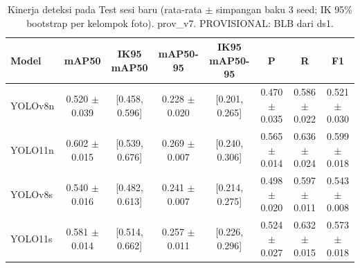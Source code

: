 \begin{table}[!t]
\centering
\caption{Kinerja deteksi pada Test sesi baru (rata-rata $\pm$ simpangan baku 3 seed; IK 95\% bootstrap per kelompok foto). prov\_v7. PROVISIONAL: BLB dari ds1.}
\label{tab:utama_test_new_session_dengan_background}
\footnotesize
\begin{tabular}{lccccccc}
\hline
\textbf{Model} & \textbf{mAP50} & \textbf{IK95 mAP50} & \textbf{mAP50-95} & \textbf{IK95 mAP50-95} & \textbf{P} & \textbf{R} & \textbf{F1} \\
\hline
YOLOv8n & 0.520 $\pm$ 0.039 & [0.458, 0.596] & 0.228 $\pm$ 0.020 & [0.201, 0.265] & 0.470 $\pm$ 0.035 & 0.586 $\pm$ 0.022 & 0.521 $\pm$ 0.030 \\
YOLO11n & 0.602 $\pm$ 0.015 & [0.539, 0.676] & 0.269 $\pm$ 0.007 & [0.240, 0.306] & 0.565 $\pm$ 0.014 & 0.636 $\pm$ 0.024 & 0.599 $\pm$ 0.018 \\
YOLOv8s & 0.540 $\pm$ 0.016 & [0.482, 0.613] & 0.241 $\pm$ 0.007 & [0.214, 0.275] & 0.498 $\pm$ 0.020 & 0.597 $\pm$ 0.011 & 0.543 $\pm$ 0.008 \\
YOLO11s & 0.581 $\pm$ 0.014 & [0.514, 0.662] & 0.257 $\pm$ 0.011 & [0.226, 0.296] & 0.524 $\pm$ 0.027 & 0.632 $\pm$ 0.015 & 0.573 $\pm$ 0.018 \\
\hline
\end{tabular}
\end{table}

